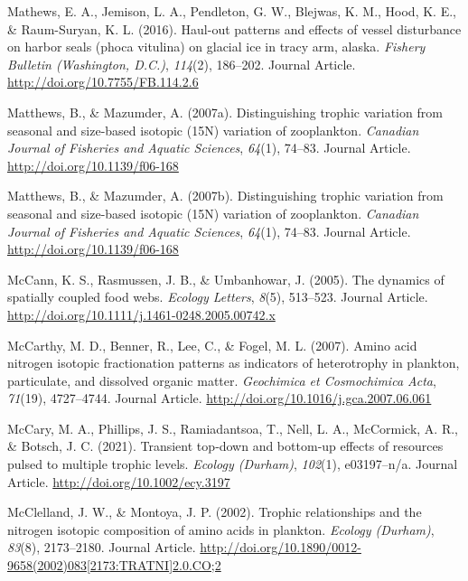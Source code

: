 \documentclass [11pt, proquest] {uwthesis}[2015/03/03]
\begin{document}
\hypertarget{ref-Mathews2016}{}
Mathews, E. A., Jemison, L. A., Pendleton, G. W., Blejwas, K. M., Hood,
K. E., \& Raum-Suryan, K. L. (2016). Haul-out patterns and effects of
vessel disturbance on harbor seals (phoca vitulina) on glacial ice in
tracy arm, alaska. \emph{Fishery Bulletin (Washington, D.C.)},
\emph{114}(2), 186--202. Journal Article.
\url{http://doi.org/10.7755/FB.114.2.6}

\hypertarget{ref-Matthews2007}{}
Matthews, B., \& Mazumder, A. (2007a). Distinguishing trophic variation
from seasonal and size-based isotopic (15N) variation of zooplankton.
\emph{Canadian Journal of Fisheries and Aquatic Sciences}, \emph{64}(1),
74--83. Journal Article. \url{http://doi.org/10.1139/f06-168}

\hypertarget{ref-Mathews2007}{}
Matthews, B., \& Mazumder, A. (2007b). Distinguishing trophic variation
from seasonal and size-based isotopic (15N) variation of zooplankton.
\emph{Canadian Journal of Fisheries and Aquatic Sciences}, \emph{64}(1),
74--83. Journal Article. \url{http://doi.org/10.1139/f06-168}

\hypertarget{ref-McCann2005}{}
McCann, K. S., Rasmussen, J. B., \& Umbanhowar, J. (2005). The dynamics
of spatially coupled food webs. \emph{Ecology Letters}, \emph{8}(5),
513--523. Journal Article.
\url{http://doi.org/10.1111/j.1461-0248.2005.00742.x}

\hypertarget{ref-McCarthy2007}{}
McCarthy, M. D., Benner, R., Lee, C., \& Fogel, M. L. (2007). Amino acid
nitrogen isotopic fractionation patterns as indicators of heterotrophy
in plankton, particulate, and dissolved organic matter. \emph{Geochimica
et Cosmochimica Acta}, \emph{71}(19), 4727--4744. Journal Article.
\url{http://doi.org/10.1016/j.gca.2007.06.061}

\hypertarget{ref-McCary2021}{}
McCary, M. A., Phillips, J. S., Ramiadantsoa, T., Nell, L. A.,
McCormick, A. R., \& Botsch, J. C. (2021). Transient top‐down and
bottom‐up effects of resources pulsed to multiple trophic levels.
\emph{Ecology (Durham)}, \emph{102}(1), e03197--n/a. Journal Article.
\url{http://doi.org/10.1002/ecy.3197}

\hypertarget{ref-McClelland2002}{}
McClelland, J. W., \& Montoya, J. P. (2002). Trophic relationships and
the nitrogen isotopic composition of amino acids in plankton.
\emph{Ecology (Durham)}, \emph{83}(8), 2173--2180. Journal Article.
\href{http://doi.org/10.1890/0012-9658(2002)083\%5B2173:TRATNI\%5D2.0.CO;2}{http://doi.org/10.1890/0012-9658(2002)083{[}2173:TRATNI{]}2.0.CO;2}
\end{document}
